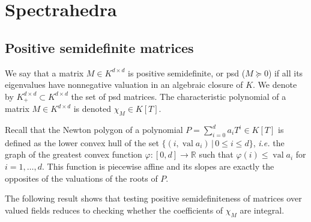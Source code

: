\documentclass{elsarticle}
\theoremstyle{plain}
\theoremstyle{definition}
\newcommand{\R}{\mathbb{R}} %
\DeclareMathOperator{\val}{val}
\begin{document}
\section{Spectrahedra}
\label{sec:spectrahedra}

\subsection{Positive semidefinite matrices}
\newcommand\Mat{Positive semidefinite matrix }
\newcommand\mats{positive semidefinite matrices }
\newcommand\Mats{positive semidefinite matrices }

\begin{definition}
  We say that a matrix $M \in K^{d \times d}$ is {positive semidefinite, or psd} ($M \succeq 0$)
  if all its eigenvalues have nonnegative valuation in an algebraic closure of $K$.
  We denote by $K^{d \times d}_+ \subset K^{d\times d}$ the set of psd matrices.
  The characteristic polynomial of a matrix $M \in K^{d\times d}$ is denoted $\chi_M \in K[T]$.
\end{definition}

Recall that the {Newton polygon} of a polynomial $P = \sum_{i=0}^{d} a_i T^i \in K[T]$ is
defined as the lower convex hull of the set $\{(i, \val a_i) \,|\, 0 \le i \le d\}$, {\it i.e.} the
graph of the greatest convex function $\varphi : [0,d] \to \R$ such that $\varphi(i) \leq \val a_i$
for $i=1,\ldots,d$. This function is piecewise affine and its slopes are exactly the opposites of the valuations
of the roots of $P$.

The following result shows that testing positive semidefiniteness of matrices over
valued fields reduces to checking whether the coefficients of $\chi_M$ are integral.
\end{document}
